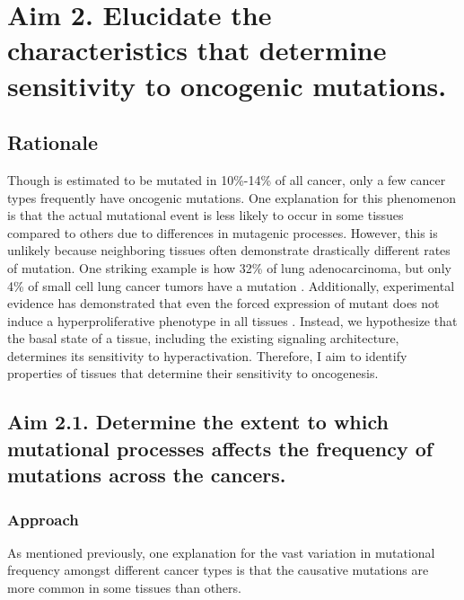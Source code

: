 \section{Aim 2. Elucidate the characteristics that determine sensitivity to oncogenic \KRAS{} mutations.}

\subsection*{Rationale}

Though \KRAS{} is estimated to be mutated in 10\%-14\% \cite{Bailey2018, Prior2020TheCancer} of all cancer, only a few cancer types frequently have oncogenic \KRAS{} mutations.
One explanation for this phenomenon is that the actual mutational event is less likely to occur in some tissues compared to others due to differences in mutagenic processes.
However, this is unlikely because neighboring tissues often demonstrate drastically different rates of \KRAS{} mutation.
One striking example is how 32\% of lung adenocarcinoma, but only 4\% of small cell lung cancer tumors have a \KRAS{} mutation \cite{Bailey2018, Prior2020TheCancer}.
Additionally, experimental evidence has demonstrated that even the forced expression of mutant \kras{} does not induce a hyperproliferative phenotype in all tissues \cite{Guerra2003TumorContext., Ray2011EpithelialModel,  Parikh2012MouseResponses}.
Instead, we hypothesize that the basal state of a tissue, including the existing signaling architecture, determines its sensitivity to \KRAS{} hyperactivation.
Therefore, I aim to identify properties of tissues that determine their sensitivity to \KRAS{} oncogenesis.


\subsection*{Aim 2.1. Determine the extent to which mutational processes affects the frequency of \KRAS{} mutations across the cancers.}

\subsubsection*{Approach}

As mentioned previously, one explanation for the vast variation in \KRAS{} mutational frequency amongst different cancer types is that the causative mutations are more common in some tissues than others.


